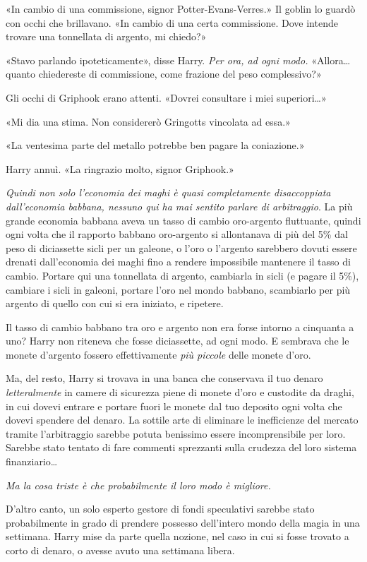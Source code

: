 «In cambio di una commissione, signor Potter-Evans-Verres.» Il goblin lo guardò con occhi che brillavano. «In cambio di una certa commissione. Dove intende trovare una tonnellata di argento, mi chiedo?»

«Stavo parlando ipoteticamente», disse Harry. \textit{Per ora, ad ogni modo.} «Allora… quanto chiedereste di commissione, come frazione del peso complessivo?»

Gli occhi di Griphook erano attenti. «Dovrei consultare i miei superiori…»

«Mi dia una stima. Non considererò Gringotts vincolata ad essa.»

«La ventesima parte del metallo potrebbe ben pagare la coniazione.»

Harry annuì. «La ringrazio molto, signor Griphook.»

\textit{Quindi non solo l’economia dei maghi è quasi completamente disaccoppiata dall’economia babbana, nessuno qui ha mai sentito parlare di arbitraggio}. La più grande economia babbana aveva un tasso di cambio oro-argento fluttuante, quindi ogni volta che il rapporto babbano oro-argento si allontanava di più del 5\% dal peso di diciassette sicli per un galeone, o l’oro o l’argento sarebbero dovuti essere drenati dall’economia dei maghi fino a rendere impossibile mantenere il tasso di cambio. Portare qui una tonnellata di argento, cambiarla in sicli (e pagare il 5\%), cambiare i sicli in galeoni, portare l’oro nel mondo babbano, scambiarlo per più argento di quello con cui si era iniziato, e ripetere.

Il tasso di cambio babbano tra oro e argento non era forse intorno a cinquanta a uno? Harry non riteneva che fosse diciassette, ad ogni modo. E sembrava che le monete d’argento fossero effettivamente \textit{più piccole} delle monete d’oro.

Ma, del resto, Harry si trovava in una banca che conservava il tuo denaro \textit{letteralmente} in camere di sicurezza piene di monete d’oro e custodite da draghi, in cui dovevi entrare e portare fuori le monete dal tuo deposito ogni volta che dovevi spendere del denaro. La sottile arte di eliminare le inefficienze del mercato tramite l’arbitraggio sarebbe potuta benissimo essere incomprensibile per loro. Sarebbe stato tentato di fare commenti sprezzanti sulla crudezza del loro sistema finanziario…

\textit{Ma la cosa triste è che probabilmente il loro modo è migliore.}

D’altro canto, un solo esperto gestore di fondi speculativi sarebbe stato probabilmente in grado di prendere possesso dell’intero mondo della magia in una settimana. Harry mise da parte quella nozione, nel caso in cui si fosse trovato a corto di denaro, o avesse avuto una settimana libera.

